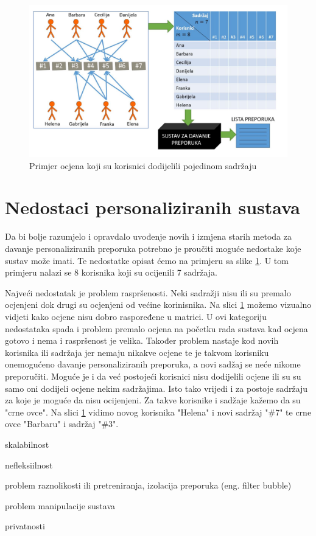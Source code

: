 \documentclass[a4paper,oneside,12pt]{memoir} %
\begin{document}
\begin{figure}[!h]
\begin{center}
\includegraphics[scale=0.6]{slike/primjer_ocjene.jpg}
\caption{Primjer ocjena koji su korisnici dodijelili pojedinom sadržaju}
\label{fig: primjer ocjena}
\end{center}
\end{figure}

\chapter{Nedostaci personaliziranih sustava}
\label{ch: nedostaci personaliziranih sustava}
\par 
Da bi bolje razumjelo i opravdalo uvođenje novih i izmjena starih metoda za davanje personaliziranih preporuka potrebno je proučiti moguće nedostake koje sustav može imati. Te nedostatke opisat ćemo na primjeru sa slike \ref{fig: primjer ocjena}. U tom primjeru nalazi se 8  korisnika koji su ocijenili 7 sadržaja.
\par 
Najveći nedostatak je problem raspršenosti. Neki sadražji nisu ili su premalo ocjenjeni dok drugi  su ocjenjeni od većine korinisnika. Na slici \ref{fig: primjer ocjena} možemo vizualno vidjeti kako ocjene nisu dobro raspoređene u matrici. U ovi kategoriju nedostataka spada i problem premalo ocjena na početku rada sustava kad ocjena gotovo i nema i raspršenost je velika. Također problem nastaje kod novih korisnika ili sadržaja jer nemaju nikakve ocjene te je takvom korisniku onemogućeno davanje personaliziranih preporuka, a novi sadžaj se neće nikome preporučiti. Moguće je i da već postojeći korisnici nisu dodijelili ocjene ili su su samo oni dodijeli ocjene nekim sadržajima. Isto tako vrijedi i za postoje sadržaju za koje je moguće da nisu ocijenjeni. Za takve korisnike i sadžaje kažemo da su "crne ovce". Na slici \ref{fig: primjer ocjena} vidimo novog korisnika "Helena" i novi sadržaj "\#7" te crne ovce "Barbaru" i sadržaj "\#3".
\par 
skalabilnost
\par 
nefleksiilnost
\par 
problem raznolikosti ili pretreniranja, izolacija preporuka (eng. filter bubble)
\par 
problem manipulacije sustava
\par 
privatnosti
\end{document}
